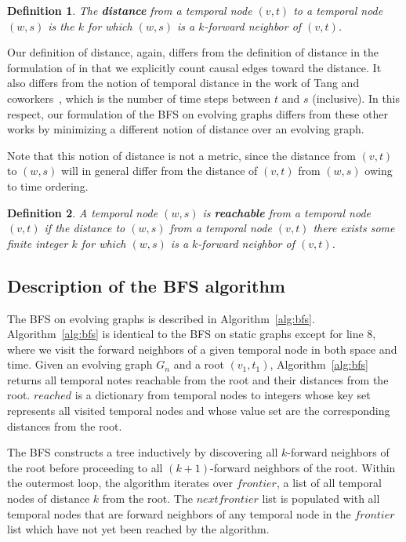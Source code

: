 \documentclass[10pt,conference,compsocconf]{IEEEtran}
\newtheorem{defn}{Definition}
\theoremstyle{definition}
\begin{document}
\begin{defn}
The \textbf{distance} from a temporal node $(v, t)$ to a temporal node $(w, s)$ is
the $k$ for which $(w, s)$ is a $k$-forward neighbor of $(v, t)$.
\end{defn}

Our definition of distance, again, differs from the definition of distance
in the formulation of \cite{gphe11,grihig13} in that we explicitly count causal
edges toward the distance. It also differs from the notion of temporal distance
in the work of Tang and coworkers~\cite{tmml10}, which is the number of time
steps between $t$ and $s$ (inclusive). In this respect, our formulation of the
BFS on evolving graphs differs from these other works by minimizing a different
notion of distance over an evolving graph.

Note that this notion of distance is not a metric, since the distance from $(v, t)$
to $(w, s)$ will in general differ from the distance of $(v, t)$ from $(w, s)$
owing to time ordering.


\begin{defn}
A temporal node $(w, s)$ is \textbf{reachable} from a temporal node $(v, t)$ if
the distance to $(w, s)$ from a temporal node $(v, t)$ there exists some finite
integer $k$ for which $(w, s)$ is a $k$-forward neighbor of $(v, t)$.
\end{defn}

\subsection{Description of the BFS algorithm}
\label{sec:descr-algor}

The BFS on evolving graphs is described in Algorithm~\ref{alg:bfs}.
Algorithm~\ref{alg:bfs} is identical to the BFS on static graphs except for
line $8$, where we visit the forward neighbors of a given temporal node
in both space and time.
Given an evolving graph $G_n$ and a root $(v_1, t_1)$,
Algorithm~\ref{alg:bfs} returns all temporal notes reachable from the root and
their distances from the root.
$reached$ is a dictionary from temporal nodes to integers whose key set represents
all visited temporal nodes and whose value set are the corresponding distances
from the root.

The BFS constructs a tree inductively by discovering all $k$-forward neighbors
of the root before proceeding to all $(k+1)$-forward neighbors of the root.
Within the outermost loop, the algorithm iterates over $frontier$, a list of all
temporal nodes of distance $k$ from the root. The $nextfrontier$ list is populated
with all temporal nodes that are forward neighbors of any temporal node in the
$frontier$ list which have not yet been reached by the algorithm.
\end{document}
